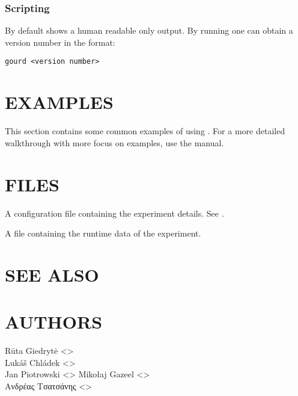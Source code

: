 \documentclass[a4paper,english]{article}
\begin{document}
\begin{adjustwidth}{18pt}{0pt}
            \subsubsection{Scripting}
                By default   shows a human readable only output. By
                running    one can obtain a version number
                in the format:

                \texttt{gourd <version number>}



    \section{EXAMPLES}

        This section contains some common examples of using .
        For a more detailed walkthrough with more focus on examples, use the  manual.


    \section{FILES}

        \begin{Description}[Files]\setlength{\itemsep}{0cm}
            \item[\File{gourd.toml}] A configuration file containing the experiment details. See .
            \item[\File{<experiment-dir>/<experiment-number>.lock}] A file containing the runtime data of the experiment.
        \end{Description}

    \section{SEE ALSO}



    \section{AUTHORS}
    Rūta Giedrytė <>\\[0.1cm]\MANbr
    Lukáš Chládek <>\\[0.1cm]\MANbr
    Jan Piotrowski <>
    Mikołaj Gazeel <>\\[0.1cm]\MANbr
    Ανδρέας Τσατσάνης <>\\[0.1cm]\MANbr
\end{adjustwidth}
\end{document}
